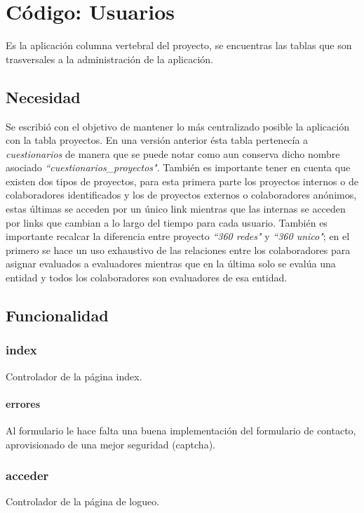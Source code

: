 \documentclass[10pt,a4paper]{book}
\begin{document}
	\chapter{Código: Usuarios}
		
	Es la aplicación columna vertebral del proyecto, se encuentras las tablas que son trasversales a la administración de la aplicación.

	\section{Necesidad}
	
	Se escribió con el objetivo de mantener lo más centralizado posible la aplicación con la tabla proyectos. En una versión anterior ésta tabla pertenecía a \textit{cuestionarios} de manera que se puede notar como aun conserva dicho nombre asociado \textit{``cuestionarios\_proyectos"}. También es importante tener en cuenta que existen dos tipos de proyectos, para esta primera parte los proyectos internos o de colaboradores identificados y los de proyectos externos o colaboradores anónimos, estas últimas se acceden por un único link mientras que las internas se acceden por links que cambian a lo largo del tiempo para cada usuario. También es importante recalcar la diferencia entre proyecto \textit{``360 redes"} y \textit{``360 unico"}; en el primero se hace un uso exhaustivo de las relaciones entre los colaboradores para asignar evaluados a evaluadores mientras que en la última solo se evalúa una entidad y todos los colaboradores son evaluadores de esa entidad.

	\section{Funcionalidad}

	\subsection{index}
	Controlador de la página index.

	\subsubsection{errores} Al formulario le hace falta una buena implementación del formulario de contacto, aprovisionado de una mejor seguridad (captcha).


	\subsection{acceder}
	Controlador de la página de logueo.
\end{document}
